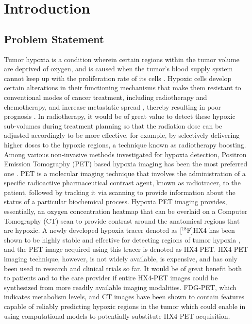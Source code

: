 \chapter{Introduction}
\label{Introduction}



\section{Problem Statement}
Tumor hypoxia is a condition wherein certain regions within the tumor volume are deprived of oxygen, and is caused when the tumor's blood supply system cannot keep up with the proliferation rate of its cells \cite{hockel2001tumor}. Hypoxic cells develop certain alterations in their functioning mechanisms that make them resistant to conventional modes of cancer treatment, including radiotherapy and chemotherapy, and increase metastatic spread \cite{muz2015role}, thereby resulting in poor prognosis \cite{vaupel2007hypoxia}. In radiotherapy, it would be of great value to detect these hypoxic sub-volumes during treatment planning so that the radiation dose can be adjusted accordingly to be more effective, for example, by selectively delivering higher doses to the hypoxic regions, a technique known as radiotherapy boosting. Among various non-invasive methods investigated for hypoxia detection, Positron Emission Tomography (PET) based hypoxia imaging has been the most preferred one \cite{fleming2015imaging}. PET is a molecular imaging technique that involves the administration of a specific radioactive pharmaceutical contrast agent, known as radiotracer, to the patient, followed by tracking it via scanning to provide information about the status of a particular biochemical process. Hypoxia PET imaging provides, essentially, an oxygen concentration heatmap that can be overlaid on a Computer Tomography (CT) scan to provide contrast around the anatomical regions that are hypoxic. A newly developed hypoxia tracer denoted as [$^{18}$F]HX4 has been shown to be highly stable and effective for detecting regions of tumor hypoxia \cite{sanduleanu2020hypoxia}, and the PET image acquired using this tracer is denoted as HX4-PET. HX4-PET imaging technique, however, is not widely available, is expensive, and has only been used in research and clinical trials so far. It would be of great benefit both to patients and to the care provider if entire HX4-PET images could be synthesized from more readily available imaging modalities. FDG-PET, which indicates metabolism levels, and CT images have been shown to contain features capable of reliably predicting hypoxic regions in the tumor \cite{even2017predicting, sanduleanu2020non} which could enable in using computational models to potentially substitute HX4-PET acquisition.

